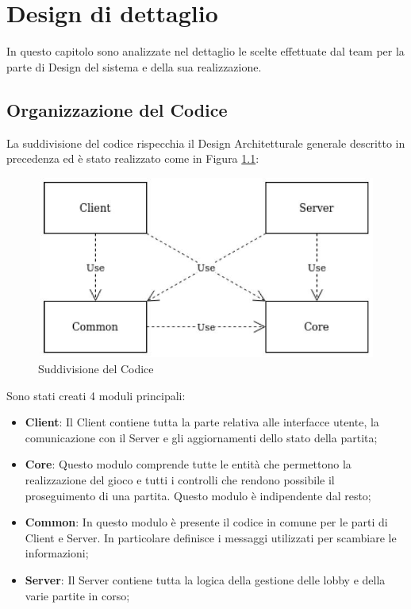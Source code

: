 \chapter{Design di dettaglio}

In questo capitolo sono analizzate nel dettaglio le scelte effettuate dal team per la parte di Design del sistema e della sua realizzazione.

\section{Organizzazione del Codice}
La suddivisione del codice rispecchia il Design Architetturale generale descritto in precedenza ed \`e stato realizzato come in Figura \ref{fig:SudCod}:

\begin{figure}[ht]
\centering
\includegraphics[width=12cm, height=6cm]{img/OrganizationCode.jpg}
\caption{Suddivisione del Codice}
\label{fig:SudCod}
\end{figure}

Sono stati creati 4 moduli principali:
\begin{itemize}
    \item \textbf{Client}: Il Client contiene tutta la parte relativa alle interfacce utente, la comunicazione con il Server e gli aggiornamenti dello stato della partita;
    \item \textbf{Core}: Questo modulo comprende tutte le entit\`a che permettono la realizzazione del gioco e tutti i controlli che rendono possibile il proseguimento di una partita. Questo modulo \`e indipendente dal resto;
    \item \textbf{Common}: In questo modulo \`e presente il codice in comune per le parti di Client e Server. In particolare definisce i messaggi utilizzati per scambiare le informazioni;
    \item \textbf{Server}: Il Server contiene tutta la logica della gestione delle lobby e della varie partite in corso;
\end{itemize}

